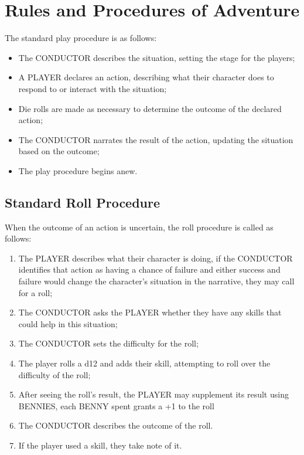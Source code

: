 \section{Rules and Procedures of Adventure}
\label{sec:adventure}
The standard play procedure is as follows:
\begin{itemize}
    \item The CONDUCTOR describes the situation, setting the stage for the players;
    \item A PLAYER declares an action, describing what their character does to respond to or interact with the situation;
    \item Die rolls are made as necessary to determine the outcome of the declared action;
    \item The CONDUCTOR narrates the result of the action, updating the situation based on the outcome;
    \item The play procedure begins anew.
\end{itemize}

\subsection{Standard Roll Procedure}
When the outcome of an action is uncertain, the roll procedure is called as follows:
\begin{enumerate}
    \item {The PLAYER describes what their character is doing, if the CONDUCTOR identifies that action as having a chance of failure and either success and failure would change the character's situation in the narrative, they may call for a roll;}
    \item {The CONDUCTOR asks the PLAYER whether they have any skills that could help in this situation;}
    \item {The CONDUCTOR sets the difficulty for the roll;}
    \item {The player rolls a d12 and adds their skill, attempting to roll over the difficulty of the roll;}
    \item {After seeing the roll's result, the PLAYER may supplement its result using BENNIES, each BENNY spent grants a +1 to the roll}
    \item {The CONDUCTOR describes the outcome of the roll.}
    \item {If the player used a skill, they take note of it.}
\end{enumerate}

